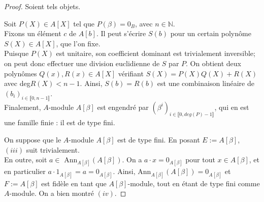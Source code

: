\documentclass[10pt, twoside]{article}
\theoremstyle{plain}
\theoremstyle{definition}
\theoremstyle{plain}
\theoremstyle{plain}
\theoremstyle{definition}
\theoremstyle{remark}
\begin{document}
\begin{proof}
    Soient tels objets.

     Soit $P(X) \in A[X]$ tel que $P(\beta) = 0_B$, avec $n \in \mathbb{N}$.\\
    Fixons un élément $c$ de $A[b]$. Il peut s'écrire $S(b)$ pour un certain polynôme $S(X) \in A[X]$, que l'on fixe.\\
    Puisque $P(X)$ est unitaire, son coefficient dominant est trivialement inversible; on peut donc effectuer une division euclidienne de $S$ par $P$. On obtient deux polynômes $Q(x), R(x) \in A[X]$ vérifiant $S(X) = P(X)Q(X) + R(X)$ avec deg$R(X) < n-1$. Ainsi, $S(b) = R(b)$ est une combinaison linéaire de $(b_i)_{i \in \llbracket 0, n-1 \rrbracket}$.\\
    Finalement, $A$-module $A[\beta]$ est engendré par $(\beta^i)_{i \in \llbracket 0, deg(P)-1 \rrbracket}$, qui en est une famille finie : il est de type fini.

     On suppose que le $A$-module $A[\beta]$ est de type fini. En posant $E := A[\beta]$, $(iii)$ suit trivialement.\\
    En outre, soit $a \in$ Ann$_{A[\beta]}(A[\beta])$. On a $a \cdot x = 0_{A[\beta]}$ pour tout $x \in A[\beta]$, et en particulier $a \cdot 1_{A[\beta]} = a = 0_{A[\beta]}$. Ainsi, Ann$_{A[\beta]}(A[\beta]) = {0_{A[\beta]}}$ et $F := A[\beta]$ est fidèle en tant que $A[\beta]$-module, tout en étant de type fini comme $A$-module. On a bien montré $(iv)$.


\end{proof}
\end{document}
